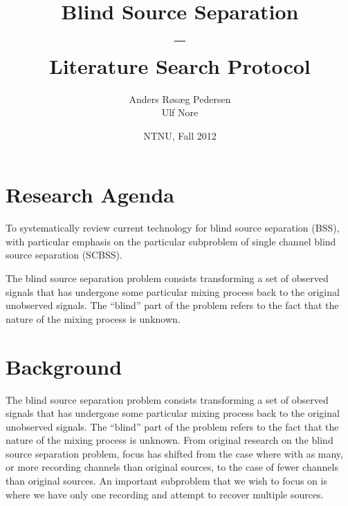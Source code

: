 \documentclass[11pt, oneside, a4paper]{article}
\begin{document}

\title{Blind Source Separation\\--\\Literature Search Protocol}
\author{Anders Røsæg Pedersen\\Ulf Nore}
\date{NTNU, Fall 2012}    %
\maketitle


\tableofcontents



\section{Research Agenda}
To systematically review current technology for blind source separation (BSS), with particular emphasis on the particular subproblem of single channel blind source separation (SCBSS).

The blind source separation problem consists transforming a set of observed signals that has undergone some particular mixing process back to the original unobserved signals. The ``blind'' part of the problem refers to the fact that the nature of the mixing process is unknown. 

\section{Background}
The blind source separation problem consists transforming a set of observed signals that has undergone some particular mixing process back to the original unobserved signals. The “blind” part of the problem refers to the fact that the nature of the mixing process is unknown. From original research on the blind source separation problem, focus has shifted from the case where with as many, or more recording channels than original sources, to the case of fewer channels than original sources. An important subproblem that we wish to focus on is where we have only one recording and attempt to recover multiple sources.
\end{document}
